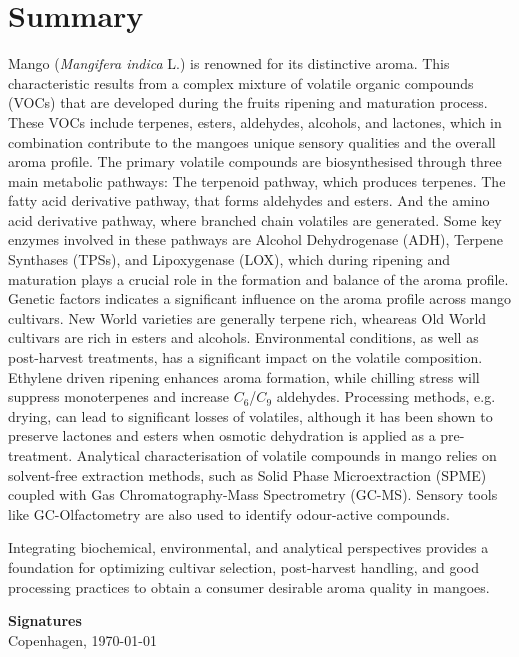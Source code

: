 \section*{Summary}
Mango (\textit{Mangifera indica} L.) is renowned for its distinctive aroma. This characteristic results from a complex mixture of volatile organic compounds (VOCs) that are developed during the fruits ripening and maturation process. These VOCs include terpenes, esters, aldehydes, alcohols, and lactones, which in combination contribute to the mangoes unique sensory qualities and the overall aroma profile. The primary volatile compounds are biosynthesised through three main metabolic pathways: The terpenoid pathway, which produces terpenes. The fatty acid derivative pathway, that forms aldehydes and esters. And the amino acid derivative pathway, where branched chain volatiles are generated. Some key enzymes involved in these pathways are Alcohol Dehydrogenase (ADH), Terpene Synthases (TPSs), and Lipoxygenase (LOX), which during ripening and maturation plays a crucial role in the formation and balance of the aroma profile.
Genetic factors indicates a significant influence on the aroma profile across mango cultivars. New World varieties are generally terpene rich, wheareas Old World cultivars are rich in esters and alcohols. Environmental conditions, as well as post-harvest treatments, has a significant impact on the volatile composition. Ethylene driven ripening enhances aroma formation, while chilling stress will suppress monoterpenes and increase $C_6$/$C_9$ aldehydes. Processing methods, e.g. drying, can lead to significant losses of volatiles, although it has been shown to preserve lactones and esters when osmotic dehydration is applied as a pre-treatment.
Analytical characterisation of volatile compounds in mango relies on solvent-free extraction methods, such as Solid Phase Microextraction (SPME) coupled with Gas Chromatography-Mass Spectrometry (GC-MS). Sensory tools like GC-Olfactometry are also used to identify odour-active compounds. 

\vspace{1em}
Integrating biochemical, environmental, and analytical perspectives provides a foundation for optimizing cultivar selection, post-harvest handling, and good processing practices to obtain a consumer desirable aroma quality in mangoes.



\vspace{2em}
\begin{center}
    \textbf{Signatures}\\[0.5em]
    {\small Copenhagen, \today}
    \end{center}
    
